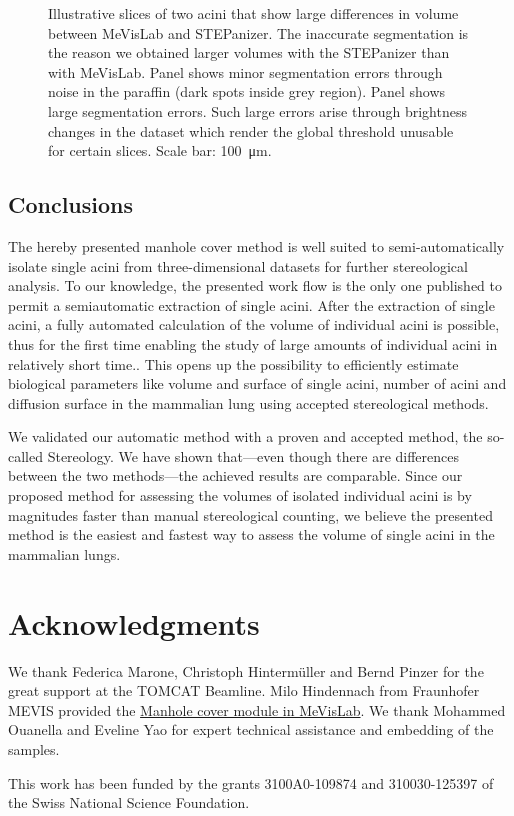 \documentclass[twoside,paper=a4,abstract=true,english,DIV=calc]{scrartcl}
\begin{document}
\begin{figure}
{		\label{subfig:60e_acinus38}%
	}%
	\hfill%
	\caption{Illustrative slices of two acini that show large differences in volume between MeVisLab and STEPanizer. The inaccurate segmentation is the reason we obtained larger volumes with the STEPanizer than with MeVisLab. Panel \protect{} shows minor segmentation errors through noise in the paraffin (dark spots inside grey region). Panel \protect{} shows large segmentation errors. Such large errors arise through brightness changes in the dataset which render the global threshold unusable for certain slices. Scale bar: \SI{100}{\micro\meter}.}
	\label{fig:MeVisSegmentation}
\end{figure}

\subsection{Conclusions}
The hereby presented manhole cover method is well suited to semi-automatically isolate single acini from three-dimensional datasets for further stereological analysis. To our knowledge, the presented work flow is the only one published to permit a semiautomatic extraction of single acini. After the extraction of single acini, a fully automated calculation of the volume of individual acini is possible, thus for the first time enabling the study of large amounts of individual acini in relatively short time.. This opens up the possibility to efficiently estimate biological parameters like volume and surface of single acini, number of acini and diffusion surface in the mammalian lung using accepted stereological methods.

We validated our automatic method with a proven and accepted method, the so-called Stereology. We have shown that---even though there are differences between the two methods---the achieved results are comparable. Since our proposed method for assessing the volumes of isolated individual acini is by magnitudes faster than manual stereological counting, we believe the presented method is the easiest and fastest way to assess the volume of single acini in the mammalian lungs.

\clearpage
\section{Acknowledgments}
We thank Federica Marone, Christoph Hintermüller and Bernd Pinzer for the great support at the TOMCAT Beamline. Milo Hindennach from Fraunhofer MEVIS provided the \href{http://www.mevis-research.de/cgi-bin/discus/board-auth.cgi?lm=1282233250&file=/839/11760.html}{Manhole cover module in MeVisLab}. We thank Mohammed Ouanella and Eveline Yao for expert technical assistance and embedding of the samples.

This work has been funded by the grants 3100A0-109874 and 310030-125397 of the Swiss National Science Foundation.

\clearpage
\singlespacing


\end{document}
